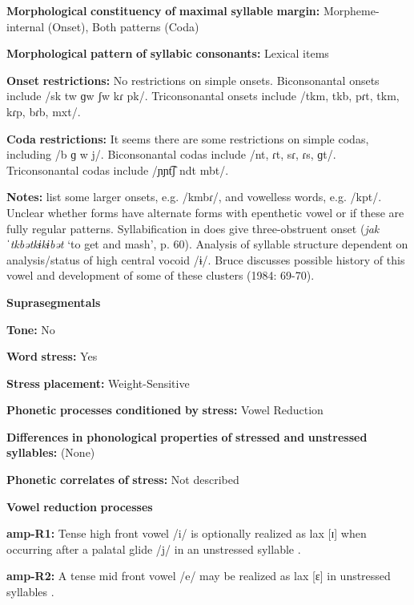 \begin{styleBody}
\textbf{Morphological} \textbf{constituency} \textbf{of} \textbf{maximal} \textbf{syllable} \textbf{margin:} Morpheme-internal (Onset), Both patterns (Coda)

\textbf{Morphological} \textbf{pattern} \textbf{of} \textbf{syllabic} \textbf{consonants:} Lexical items

\textbf{Onset} \textbf{restrictions:} No restrictions on simple onsets. Biconsonantal onsets include /sk tw ɡw ʃw kɾ pk/. Triconsonantal onsets include /tkm, tkb, pɾt, tkm, kɾp, bɾb, mxt/.

\textbf{Coda} \textbf{restrictions:} It seems there are some restrictions on simple codas, including /b ɡ w j/. Biconsonantal codas include /nt, ɾt, sɾ, ɾs, ɡt/. Triconsonantal codas include /ɲɲt͡ʃ ndt mbt/.

\textbf{Notes:} \citet{EdmistonEdmiston2003} list some larger onsets, e.g. /kmbɾ/, and vowelless words, e.g. /kpt/. Unclear whether forms have alternate forms with epenthetic vowel or if these are fully regular patterns. Syllabification in \citet{Bruce1984} does give three-obstruent onset (\textit{jakˈtkbətkɨkɨbət} ‘to get and mash’, p. 60). Analysis of syllable structure dependent on analysis/status of high central vocoid /ɨ/. Bruce discusses possible history of this vowel and development of some of these clusters (1984: 69-70).

\textbf{Suprasegmentals}

\textbf{Tone:} No

\textbf{Word} \textbf{stress:} Yes

\textbf{Stress} \textbf{placement:} Weight-Sensitive

\textbf{Phonetic} \textbf{processes} \textbf{conditioned} \textbf{by} \textbf{stress:} Vowel Reduction

\textbf{Differences} \textbf{in} \textbf{phonological} \textbf{properties} \textbf{of} \textbf{stressed} \textbf{and} \textbf{unstressed} \textbf{syllables:} (None)

\textbf{Phonetic} \textbf{correlates} \textbf{of} \textbf{stress:} Not described

\textbf{Vowel} \textbf{reduction} \textbf{processes}

\textbf{amp-R1:} Tense high front vowel /i/ is optionally realized as lax [ɪ] when occurring after a palatal glide /j/ in an unstressed syllable \citep[37]{Bruce1984}.

\textbf{amp-R2:} A tense mid front vowel /e/ may be realized as lax [ɛ] in unstressed syllables \citep[38]{Bruce1984}.


\end{styleBody}
